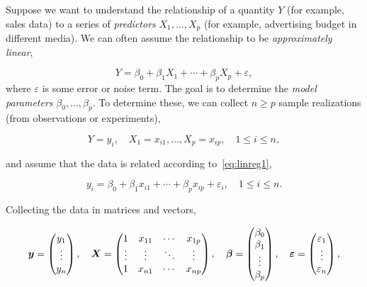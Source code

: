 \begin{example}\label{ex:1}
Suppose we want to understand the relationship of a quantity $Y$ (for example, sales data) to a series of {\em predictors} $X_1,\dots,X_p$ (for example, advertising budget in different media). We can often assume the relationship to be {\em approximately linear},

\addtocounter{equation}{1}
\begin{equation}\label{eq:linreg1}
 Y = \beta_0+\beta_1 X_1 + \cdots + \beta_p X_p + \varepsilon, 
\end{equation}
where $\varepsilon$ is some error or noise term. The goal is to determine the {\em model parameters} $\beta_0,\dots,\beta_p$.
To determine these, we can collect $n\geq p$ sample realizations (from observations or experiments),

\begin{equation*}
 Y=y_i, \quad X_1=x_{i1},\dots,X_p=x_{ip}, \quad 1\leq i\leq n,
\end{equation*}

and assume that the data is related according to~\eqref{eq:linreg1}, 

\begin{equation*}
 y_i = \beta_0+\beta_1x_{i1}+\cdots +\beta_p x_{ip}+\varepsilon_i, \quad 1\leq i\leq n.
\end{equation*}

Collecting the data in matrices and vectors,

\begin{equation*}
 \bm{y} = \begin{pmatrix}
            y_1\\ \vdots \\ y_n
           \end{pmatrix},
\quad \bm{X} = \begin{pmatrix} 
           1 & x_{11} & \cdots & x_{1p}\\
           \vdots & \vdots & \ddots & \vdots \\
           1 & x_{n1} & \cdots & x_{np}
          \end{pmatrix},
\quad \bm{\beta} = \begin{pmatrix}
                     \beta_0\\
                     \beta_1\\
                     \vdots\\
                     \beta_p
                    \end{pmatrix},
\quad \bm{\varepsilon} = \begin{pmatrix}
                  \varepsilon_1\\
                  \vdots\\
                  \varepsilon_n
                 \end{pmatrix},
\end{equation*}


\end{example}

